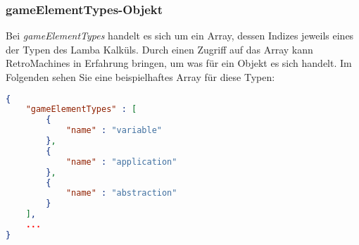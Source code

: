 \begin{minipage}{1\textwidth}

\subsubsection{gameElementTypes-Objekt}

Bei \textit{gameElementTypes} handelt es sich um ein Array, dessen Indizes jeweils eines der Typen des Lamba Kalküls. Durch einen Zugriff auf das Array kann RetroMachines in Erfahrung bringen, um was für ein Objekt es sich handelt. Im Folgenden sehen Sie eine beispielhaftes Array für diese Typen:

\begin{lstlisting}[language=json, firstnumber=1]
{
	"gameElementTypes" : [
        {
            "name" : "variable"
        },
        {
            "name" : "application"
        },
        {
            "name" : "abstraction"
        }
    ],
	...
}
\end{lstlisting}

\end{minipage}


